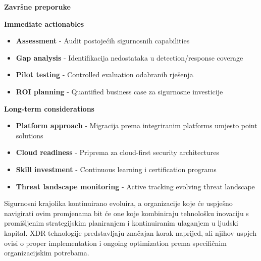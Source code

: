\textbf{Završne preporuke}

\textbf{Immediate actionables}

\begin{itemize}
\item \textbf{Assessment} - Audit postojećih sigurnosnih capabilities
\item \textbf{Gap analysis} - Identifikacija nedostataka u detection/response coverage
\item \textbf{Pilot testing} - Controlled evaluation odabranih rješenja
\item \textbf{ROI planning} - Quantified business case za sigurnosne investicije
\end{itemize}

\textbf{Long-term considerations}

\begin{itemize}
\item \textbf{Platform approach} - Migracija prema integriranim platforms umjesto point solutions
\item \textbf{Cloud readiness} - Priprema za cloud-first security architectures
\item \textbf{Skill investment} - Continuous learning i certification programs
\item \textbf{Threat landscape monitoring} - Active tracking evolving threat landscape
\end{itemize}

Sigurnosni krajolika kontinuirano evoluira, a organizacije koje će uspješno navigirati ovim promjenama bit će one koje kombiniraju tehnološku inovaciju s promišljenim strategijskim planiranjem i kontinuiranim ulaganjem u ljudski kapital. XDR tehnologije predstavljaju značajan korak naprijed, ali njihov uspjeh ovisi o proper implementation i ongoing optimization prema specifičnim organizacijskim potrebama.